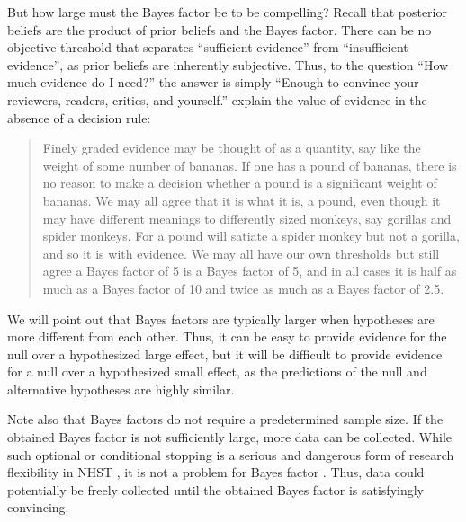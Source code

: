 \documentclass[man]{apa6}
\begin{document}
But how large must the Bayes factor be to be compelling? Recall that posterior beliefs are the product of prior beliefs and the Bayes factor. There can be no objective threshold that separates ``sufficient evidence'' from ``insufficient evidence'', as prior beliefs are inherently subjective. Thus, to the question ``How much evidence do I need?'' the answer is simply ``Enough to convince your reviewers, readers, critics, and yourself.'' \citet[p. 12]{Rouder:etal:submitted} explain the value of evidence in the absence of a decision rule: 
\begin{quote}
Finely graded evidence may be thought of as a quantity, say like the weight of some number of bananas. If one has a pound of bananas, there is no reason to make a decision whether a pound is a significant weight of bananas. We may all agree that it is what it is, a pound, even though it may have different meanings to differently sized monkeys, say gorillas and spider monkeys. For a pound will satiate a spider monkey but not a gorilla, and so it is with evidence. We may all have our own thresholds but still agree a Bayes factor of 5 is a Bayes factor of 5, and in all cases it is half as much as a Bayes factor of 10 and twice as much as a Bayes factor of 2.5.
\end{quote}
We will point out that Bayes factors are typically larger when hypotheses are more different from each other. Thus, it can be easy to provide evidence for the null over a hypothesized large effect, but it will be difficult to provide evidence for a null over a hypothesized small effect, as the predictions of the null and alternative hypotheses are highly similar. 

Note also that Bayes factors do not require a predetermined sample size. If the obtained Bayes factor is not sufficiently large, more data can be collected. While such optional or conditional stopping is a serious and dangerous form of research flexibility in NHST \citep{Simmons:etal:2011}, it is not a problem for Bayes factor \citep{Rouder:2014}. %
Thus, data could potentially be freely collected until the obtained Bayes factor is satisfyingly convincing.
\end{document}

